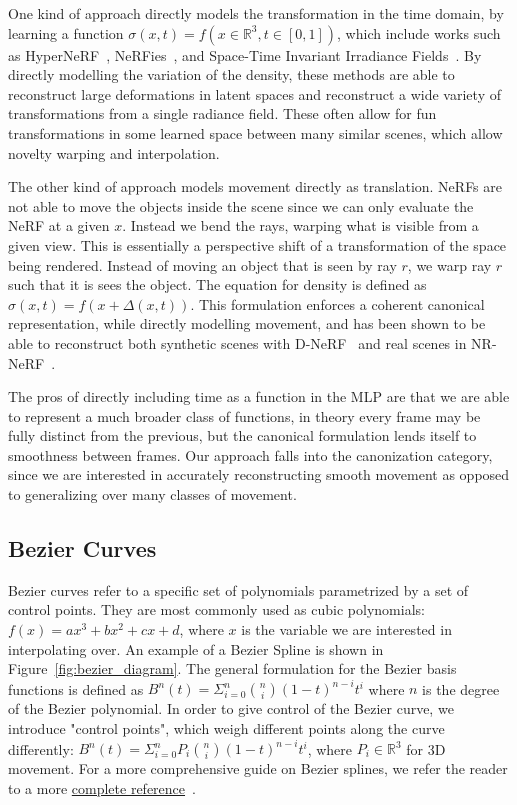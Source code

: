 One kind of approach directly models the transformation in the time domain, by learning a function $\sigma(x,t)=f(x\in\mathbb{R}^3, t\in[0,1])$, which include works such as HyperNeRF~\cite{park2021hypernerf}, NeRFies~\cite{park2021nerfies}, and Space-Time Invariant Irradiance Fields~\cite{xian2021space}. By directly modelling the variation of the density, these methods are able to reconstruct large deformations in latent spaces and reconstruct a wide variety of transformations from a single radiance field. These often allow for fun transformations in some learned space between many similar scenes, which allow novelty warping and interpolation.

The other kind of approach models movement directly as translation. NeRFs are not able to move the objects inside the scene since we can only evaluate the NeRF at a given $x$. Instead we bend the rays, warping what is visible from a given view. This is essentially a perspective shift of a transformation of the space being rendered. Instead of moving an object that is seen by ray $r$, we warp ray $r$ such that it is sees the object. The equation for density is defined as $\sigma(x,t)=f(x+\Delta(x,t))$. This formulation enforces a coherent canonical representation, while directly modelling movement, and has been shown to be able to reconstruct both synthetic scenes with D-NeRF~\cite{pumarola2020dnerf} and real scenes in NR-NeRF~\cite{tretschk2021nonrigid}.

The pros of directly including time as a function in the MLP are that we are able to represent a much broader class of functions, in theory every frame may be fully distinct from the previous, but the canonical formulation lends itself to smoothness between frames. Our approach falls into the canonization category, since we are interested in accurately reconstructing smooth movement as opposed to generalizing over many classes of movement.


\subsection*{Bezier Curves}

Bezier curves refer to a specific set of polynomials parametrized by a set of control points. They are most commonly used as cubic polynomials: $f(x) = ax^3 + bx^2 + cx + d$,
where $x$ is the variable we are interested in interpolating over. An example of a Bezier Spline is shown in Figure~\ref{fig:bezier_diagram}. The general formulation for
the Bezier basis functions is defined as $B^n(t) = \Sigma^n_{i=0}
{n \choose i} (1-t)^{n-i} t^i$ where $n$
is the degree of the Bezier polynomial. In order to give control of the Bezier curve, we
introduce "control points", which weigh different points along the curve differently:
$B^n(t) = \Sigma^n_{i=0} P_i {n \choose i} (1-t)^{n-i} t^i$, where $P_i\in\mathbb{R}^3$ for 3D
movement. For a more comprehensive guide on Bezier splines, we refer the reader to a more
\href{https://pomax.github.io/bezierinfo/index.html}{complete reference}~\cite{bezier_primer}.

